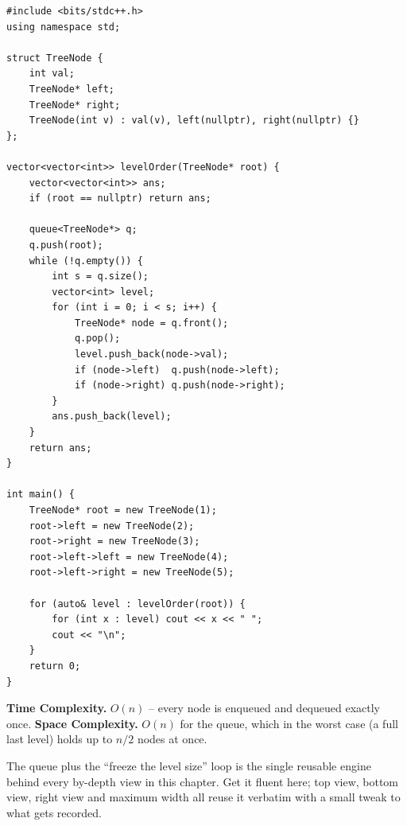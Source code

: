 \begin{lstlisting}
#include <bits/stdc++.h>
using namespace std;

struct TreeNode {
    int val;
    TreeNode* left;
    TreeNode* right;
    TreeNode(int v) : val(v), left(nullptr), right(nullptr) {}
};

vector<vector<int>> levelOrder(TreeNode* root) {
    vector<vector<int>> ans;
    if (root == nullptr) return ans;

    queue<TreeNode*> q;
    q.push(root);
    while (!q.empty()) {
        int s = q.size();
        vector<int> level;
        for (int i = 0; i < s; i++) {
            TreeNode* node = q.front();
            q.pop();
            level.push_back(node->val);
            if (node->left)  q.push(node->left);
            if (node->right) q.push(node->right);
        }
        ans.push_back(level);
    }
    return ans;
}

int main() {
    TreeNode* root = new TreeNode(1);
    root->left = new TreeNode(2);
    root->right = new TreeNode(3);
    root->left->left = new TreeNode(4);
    root->left->right = new TreeNode(5);

    for (auto& level : levelOrder(root)) {
        for (int x : level) cout << x << " ";
        cout << "\n";
    }
    return 0;
}
\end{lstlisting}

\begin{complexitybox}
\textbf{Time Complexity.} $O(n)$ -- every node is enqueued and dequeued
exactly once. \textbf{Space Complexity.} $O(n)$ for the queue, which in
the worst case (a full last level) holds up to $n/2$ nodes at once.
\end{complexitybox}

\begin{takeawaybox}
The queue plus the ``freeze the level size'' loop is the single reusable
engine behind every by-depth view in this chapter. Get it fluent here;
top view, bottom view, right view and maximum width all reuse it verbatim
with a small tweak to what gets recorded.
\end{takeawaybox}
